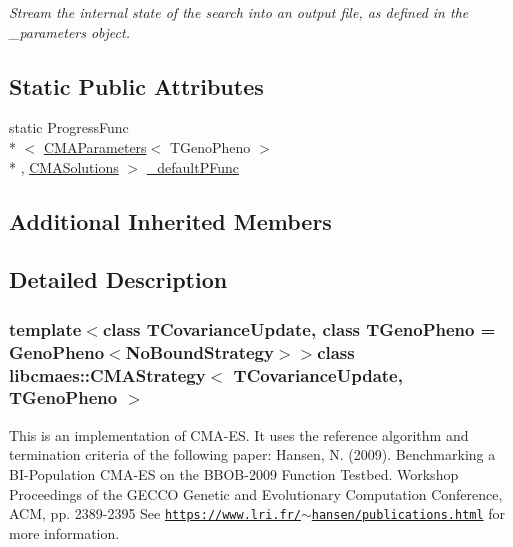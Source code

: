 \begin{DoxyCompactItemize}
\begin{DoxyCompactList}\small\item\em Stream the internal state of the search into an output file, as defined in the \-\_\-parameters object. \end{DoxyCompactList}\end{DoxyCompactItemize}
\subsection*{Static Public Attributes}
\begin{DoxyCompactItemize}
\item 
static Progress\-Func\\*
$<$ \hyperlink{classlibcmaes_1_1CMAParameters}{C\-M\-A\-Parameters}$<$ T\-Geno\-Pheno $>$\\*
, \hyperlink{classlibcmaes_1_1CMASolutions}{C\-M\-A\-Solutions} $>$ \hyperlink{classlibcmaes_1_1CMAStrategy_af6d980c670eef47ee810645739999d5b}{\-\_\-default\-P\-Func}
\end{DoxyCompactItemize}
\subsection*{Additional Inherited Members}


\subsection{Detailed Description}
\subsubsection*{template$<$class T\-Covariance\-Update, class T\-Geno\-Pheno = Geno\-Pheno$<$\-No\-Bound\-Strategy$>$$>$class libcmaes\-::\-C\-M\-A\-Strategy$<$ T\-Covariance\-Update, T\-Geno\-Pheno $>$}

This is an implementation of C\-M\-A-\/\-E\-S. It uses the reference algorithm and termination criteria of the following paper\-: Hansen, N. (2009). Benchmarking a B\-I-\/\-Population C\-M\-A-\/\-E\-S on the B\-B\-O\-B-\/2009 Function Testbed. Workshop Proceedings of the G\-E\-C\-C\-O Genetic and Evolutionary Computation Conference, A\-C\-M, pp. 2389-\/2395 See \href{https://www.lri.fr/~hansen/publications.html}{\tt https\-://www.\-lri.\-fr/$\sim$hansen/publications.\-html} for more information. 

